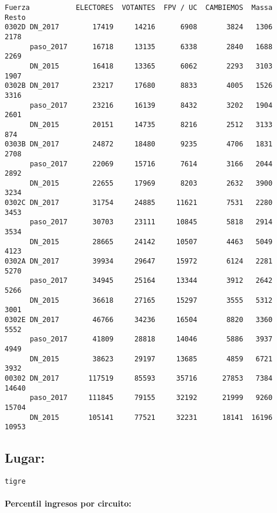 \documentclass[11pt]{article}
\begin{document}
    \begin{verbatim}
Fuerza           ELECTORES  VOTANTES  FPV / UC  CAMBIEMOS  Massa  Resto
0302D DN_2017        17419     14216      6908       3824   1306   2178
      paso_2017      16718     13135      6338       2840   1688   2269
      DN_2015        16418     13365      6062       2293   3103   1907
0302B DN_2017        23217     17680      8833       4005   1526   3316
      paso_2017      23216     16139      8432       3202   1904   2601
      DN_2015        20151     14735      8216       2512   3133    874
0303B DN_2017        24872     18480      9235       4706   1831   2708
      paso_2017      22069     15716      7614       3166   2044   2892
      DN_2015        22655     17969      8203       2632   3900   3234
0302C DN_2017        31754     24885     11621       7531   2280   3453
      paso_2017      30703     23111     10845       5818   2914   3534
      DN_2015        28665     24142     10507       4463   5049   4123
0302A DN_2017        39934     29647     15972       6124   2281   5270
      paso_2017      34945     25164     13344       3912   2642   5266
      DN_2015        36618     27165     15297       3555   5312   3001
0302E DN_2017        46766     34236     16504       8820   3360   5552
      paso_2017      41809     28818     14046       5886   3937   4949
      DN_2015        38623     29197     13685       4859   6721   3932
00302 DN_2017       117519     85593     35716      27853   7384  14640
      paso_2017     111845     79155     32192      21999   9260  15704
      DN_2015       105141     77521     32231      18141  16196  10953
    \end{verbatim}

    
    \hypertarget{lugar}{%
\subsection{Lugar:}\label{lugar}}

    
    \begin{Verbatim}[commandchars=\\\{\}]
tigre

    \end{Verbatim}

    \hypertarget{percentil-ingresos-por-circuito}{%
\paragraph{Percentil ingresos por
circuito:}\label{percentil-ingresos-por-circuito}}
\end{document}
